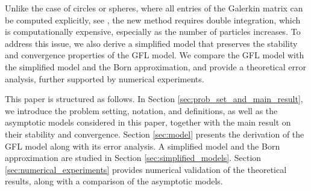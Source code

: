 \documentclass[]{article}
\numberwithin{equation}{section}
\numberwithin{theorem}{section}
\numberwithin{lemma}{section}
\numberwithin{corollary}{section}
\numberwithin{proposition}{section}
\numberwithin{definition}{section}
\begin{document}
	Unlike the case of circles or spheres, where all entries of the Galerkin matrix can be computed explicitly, see \cite{MK}, the new method requires double integration, which is computationally expensive, especially as the number of particles increases.
	To address this issue, we also derive a simplified model that preserves the stability and convergence properties of the GFL model. We compare the GFL model with the simplified model and the Born approximation, and provide a theoretical error analysis, further supported by numerical experiments.
	
	This paper is structured as follows. In Section \ref{sec:prob_set_and_main_result}, we introduce the problem setting, notation, and definitions, as well as the asymptotic models considered in this paper, together with the main result on their stability and convergence. Section \ref{sec:model} presents the derivation of the GFL model along with its error analysis.
	A simplified model and the Born approximation are studied in Section \ref{sec:simplified_models}. Section \ref{sec:numerical_experiments} provides numerical validation of the theoretical results, along with a comparison of the asymptotic models.
	
\end{document}
